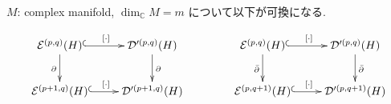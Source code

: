 \begin{tcolorbox}[mybox]
\begin{lem}
\label{lem-M-4.15}
\(M\): complex manifold, \(\dim_{\mathbb{C}}M=m\)
について以下が可換になる. 

\[
\xymatrix{
\mathcal{E}^{(p,q)}(H) \ar@{^{(}->}[r]^{[\cdot]} \ar[d]_{\partial} &
\mathcal{D}'^{(p,q)}(H) \ar[d]^{\partial} \\
\mathcal{E}^{(p+1,q)}(H) \ar@{^{(}->}[r]^{[\cdot]} &
\mathcal{D}'^{(p+1,q)}(H)
}
\qquad\qquad
\xymatrix{
\mathcal{E}^{(p,q)}(H) \ar@{^{(}->}[r]^{[\cdot]} \ar[d]_{\bar{\partial}} &
\mathcal{D}'^{(p,q)}(H) \ar[d]^{\bar{\partial}} \\
\mathcal{E}^{(p,q+1)}(H) \ar@{^{(}->}[r]^{[\cdot]} &
\mathcal{D}'^{(p,q+1)}(H)
}
\]
\end{lem}
\end{tcolorbox}
